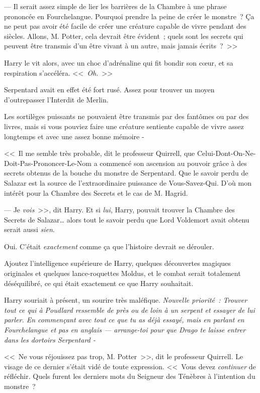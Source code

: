 --- Il serait assez simple de lier les barrières de la Chambre à une phrase prononcée en Fourchelangue. Pourquoi prendre la peine de créer le monstre~? Ça ne peut pas avoir été facile de créer une créature capable de vivre pendant des siècles. Allons, M. Potter, cela devrait être évident~; quels sont les secrets qui peuvent être transmis d'un être vivant à un autre, mais jamais écrits~?~>>

Harry le vit alors, avec un choc d'adrénaline qui fit bondir son cœur, et sa respiration s'accéléra. <<~\emph{Oh.}~>>

Serpentard avait en effet été fort rusé. Assez pour trouver un moyen d'outrepasser l'Interdit de Merlin.

Les sortilèges puissants ne pouvaient être transmis par des fantômes ou par des livres, mais si vous pouviez faire une créature sentiente capable de vivre assez longtemps et avec une assez bonne mémoire -

<<~Il me semble très probable, dit le professeur Quirrell, que Celui-Dont-On-Ne-Doit-Pas-Prononcer-Le-Nom a commencé son ascension au pouvoir grâce à des secrets obtenus de la bouche du monstre de Serpentard. Que le savoir perdu de Salazar est la source de l'extraordinaire puissance de Vous-Savez-Qui. D'où mon intérêt pour la Chambre des Secrets et le cas de M. Hagrid.

--- Je \emph{vois}~>>, dit Harry. Et si \emph{lui}, Harry, pouvait trouver la Chambre des Secrets de Salazar… alors tout le savoir perdu que Lord Voldemort avait obtenu serait aussi \emph{sien}.

Oui. C'était \emph{exactement} comme ça que l'histoire devrait se dérouler.

Ajoutez l'intelligence supérieure de Harry, quelques découvertes magiques originales et quelques lance-roquettes Moldus, et le combat serait totalement déséquilibré, ce qui était exactement ce que Harry souhaitait.

Harry souriait à présent, un sourire très maléfique. \emph{Nouvelle priorité~: Trouver tout ce qui à Poudlard ressemble de près ou de loin à un serpent et essayer de lui parler. En commençant avec tout ce que tu as déjà essayé, mais en parlant en Fourchelangue et pas en anglais — arrange-toi pour que Drago te laisse entrer dans les dortoirs Serpentard -}

<<~Ne vous réjouissez pas trop, M. Potter~>>, dit le professeur Quirrell. Le visage de ce dernier s'était vidé de toute expression. <<~Vous devez \emph{continuer} de réfléchir. Quels furent les derniers mots du Seigneur des Ténèbres à l'intention du monstre~?

